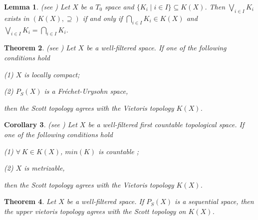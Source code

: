 \documentclass[preprint,12pt]{elsarticle}
\numberwithin{equation}{section}
\newtheorem{theorem}{Theorem}[section]
\newtheorem{lemma}[theorem]{Lemma}
\newtheorem{corollary}[theorem]{Corollary}
\begin{document}
\begin{lemma}{\rm (see \cite{GG03}) Let $X$ be a $T_{0}$ space and $\{K_{i}\mid i\in I\}\subseteq K(X)$. Then $\bigvee\limits_{i\in I}K_{i}$ exists in $(K(X),\supseteq)$ if and only if
$\bigcap\limits_{i\in I}K_{i}\in K(X)$ and $\bigvee\limits_{i\in I}K_{i}=\bigcap\limits_{i\in I}K_{i}$.}
\end{lemma}

\begin{theorem}{\rm(see \cite{EEE21,EEF30}) Let $X$ be a well-filtered space. If one of the following conditions hold

(1) $X$ is locally compact;

(2) $P_{S}(X)$ is a  Fr\'echet-Urysohn  space,

then the Scott topology agrees with the Vietoris topology $K(X)$. }

\end{theorem}

\begin{corollary}{\rm(see \cite{EEF30}) Let $X$ be a well-filtered first countable topological space. If one of the following conditions hold

(1) $\forall\ K\in K(X)$, $min(K)$ is countable ;

(2) $X$ is metrizable,

then the Scott topology agrees with the Vietoris topology $K(X)$. }

\end{corollary}


\begin{theorem} {\rm Let $X$ be a well-filtered space. If $P_{S}(X)$ is a sequential space, then the upper vietoris topology agrees with the Scott topology on $K(X)$.}
\end{theorem}
\end{document}
